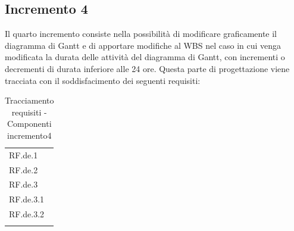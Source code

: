 \subsection{Incremento 4}
Il quarto incremento consiste nella possibilit\`{a} di modificare graficamente il diagramma di Gantt e di apportare modifiche al WBS nel caso in cui venga modificata la durata delle attivit\`{a} del diagramma di Gantt, con incrementi o decrementi di durata inferiore alle 24 ore. Questa parte di progettazione viene tracciata con il soddisfacimento dei seguenti requisiti:

\begin{longtable}{|>{\centering}p{3cm}|}
    \hline
    \multicolumn{1}{|c|}{\textbf{Requisiti}} \\ %
      \hline
        RF.de.1 \tabularnewline \hline
		RF.de.2 \tabularnewline \hline
		RF.de.3 \tabularnewline \hline
		RF.de.3.1 \tabularnewline \hline
		RF.de.3.2 \tabularnewline \hline
    \caption{Tracciamento requisiti - Componenti incremento4}
    \label{tab:Tracciamento requisiti - Componenti incremento4}
\end{longtable}